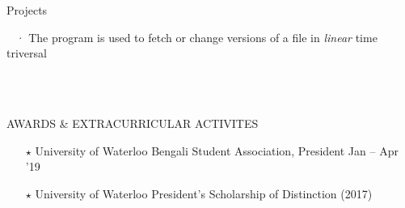 \documentclass{resume} %
\begin{document}
\begin{rSection}{Projects}
\begin{rProjectSection}
    \vspace{-0.5em}
    \hspace{21.4mm}  \hspace{3.5mm}\,\,\,\,\,·  The program is used to fetch or change versions of a file in \textit{linear} time triversal
\\




  \end{rProjectSection}
  \\ \\
\begin{rSection}{AWARDS \& EXTRACURRICULAR ACTIVITES}
\begin{itemize}
  \item[$\star$] University of Waterloo Bengali Student Association, President                    \hspace{34mm}Jan -- Apr '19
  \item[$\star$] University of Waterloo President’s Scholarship of Distinction (2017)

\end{itemize}
\end{rSection}



\end{rSection}
\end{document}
